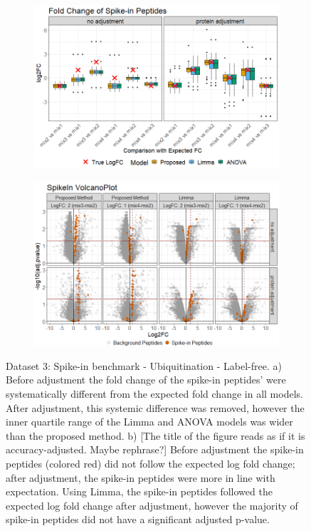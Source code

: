 \documentclass[mcp]{article}
\numberwithin{table}{section}
\def\todo#1{{\color{red}[#1]}}
\begin{document}
\begin{figure}[ht]
{}
\label{fig:computer_sim}
\end{figure}


\begin{figure}[ht]
\centering
\begin{subfigure}[c]{0.825\linewidth}
\includegraphics[width=1\textwidth]{images/spike_in_fc.png}
\caption{}
\label{fig:spikein_boxplot}
\end{subfigure}
\begin{subfigure}[c]{0.825\linewidth}
\includegraphics[width=1\textwidth]{images/spike_in_volcano.png}
\caption{}
\label{fig:spikein_prop_volcano}
\end{subfigure}
\caption{Dataset 3: Spike-in benchmark - Ubiquitination - Label-free. a) Before adjustment the fold change of the spike-in peptides' were systematically different from the expected fold change in all models. After adjustment, this systemic difference was removed, however the inner quartile range of the Limma and ANOVA models was wider than the proposed method. b) \todo{The title of the figure reads as if it is accuracy-adjusted. Maybe rephrase?} Before adjustment the spike-in peptides (colored red) did not follow the expected log fold change; after adjustment, the spike-in peptides were more in line with expectation. Using Limma, the spike-in peptides followed the expected log fold change after adjustment, however the majority of spike-in peptides did not have a significant adjusted p-value.}
\label{fig:spikein_volcano}
\end{figure}
\end{document}

